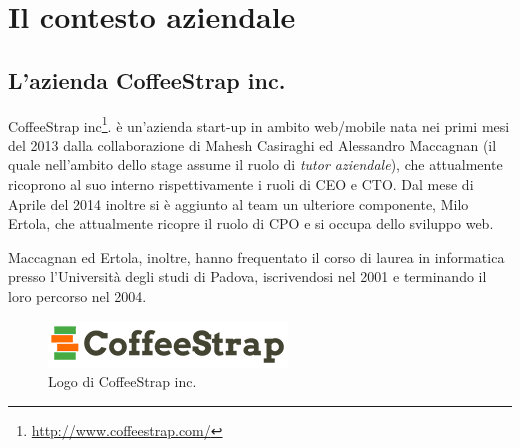 
\chapter{Il contesto aziendale}
\label{cap:contesto-aziendale}

\section{L'azienda CoffeeStrap inc.}

CoffeeStrap inc\footnote{\url{http://www.coffeestrap.com/}}. è un'azienda \gls{start-up} in ambito web/mobile nata nei primi mesi del 2013 dalla collaborazione di Mahesh Casiraghi ed Alessandro Maccagnan (il quale nell'ambito dello stage assume il ruolo di \textit{tutor aziendale}), che attualmente ricoprono al suo interno rispettivamente i ruoli di \gls{CEO} e \gls{CTO}. Dal mese di Aprile del 2014 inoltre si è aggiunto al team un ulteriore componente, Milo Ertola, che attualmente ricopre il ruolo di \gls{CPO} e si occupa dello sviluppo web. 

Maccagnan ed Ertola, inoltre, hanno frequentato il corso di laurea in informatica presso l'Università degli studi di Padova, iscrivendosi nel 2001 e terminando il loro percorso nel 2004.

\begin{figure}[htpd]
\centering
\includegraphics[width=\textwidth/2]{../immagini/coffeestrap-logo}
\caption{Logo di CoffeeStrap inc.}  
\end{figure}

